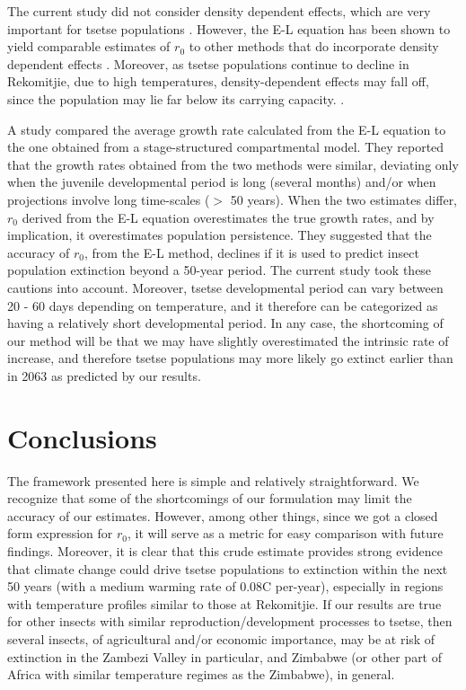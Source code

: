 \documentclass[12pt,a4paper]{article}
\begin{document}
The current study did not consider density dependent effects, which are very important for tsetse populations \cite{Rogers1975}. However, the E-L equation has been shown to yield comparable estimates of $r_0$ to other methods that do incorporate density dependent effects \cite{Cortes2016}. Moreover, as tsetse populations continue to decline in Rekomitjie, due to high temperatures, density-dependent effects may fall off, since the population may lie far below its carrying capacity. . 


A study \cite{Amarasekare2013} compared the average growth rate calculated from the E-L equation to the one obtained from a stage-structured compartmental model. They reported that the growth rates obtained from the two methods were similar, deviating only when the juvenile developmental period is long (several months) and/or when projections involve long time-scales ($>$ 50 years).  When the two estimates differ, $r_0$ derived from the E-L equation overestimates the true growth rates, and by implication, it overestimates population persistence. They suggested that the accuracy of $r_0$, from the E-L method, declines if it is used to predict insect population extinction beyond a 50-year period.  The current study took these cautions into account. Moreover, tsetse developmental period can vary between 20 - 60 days depending on temperature, and it therefore can be categorized as having a relatively short developmental period. In any case, the shortcoming of our method will be that we may have slightly overestimated the intrinsic rate of increase, and therefore tsetse populations may more likely go extinct earlier than in 2063 as predicted by our results.

\section*{Conclusions}
The framework presented here is simple and relatively straightforward. We recognize that some of the shortcomings of our formulation may limit the accuracy of our estimates.  However, among other things, since we got a closed form expression for $r_0$, it will serve as a metric for easy comparison with future findings. Moreover, it is clear that this crude estimate provides strong evidence that climate change could drive tsetse populations to extinction within the next 50 years (with a medium warming rate of 0.08\textdegree C per-year), especially in regions with temperature profiles similar to those at Rekomitjie. If our results are true for other insects with similar reproduction/development processes to tsetse, then several insects, of agricultural and/or economic importance, may be at risk of extinction in the Zambezi Valley in particular, and Zimbabwe (or other part of Africa with similar temperature regimes as the Zimbabwe), in general. 
\end{document}
